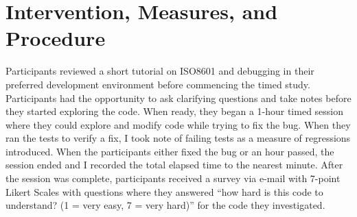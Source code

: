 \section{Intervention, Measures, and Procedure}


Participants reviewed a short tutorial on ISO8601 and debugging in their preferred development environment before commencing the timed study. Participants had the opportunity to ask clarifying questions and take notes before they started exploring the code. When ready, they began a 1-hour timed session where they could explore and modify code while trying to fix the bug. When they ran the tests to verify a fix, I took note of failing tests as a measure of regressions introduced. When the participants either fixed the bug or an hour passed, the session ended and I recorded the total elapsed time to the nearest minute. After the session was complete, participants received a survey via e-mail with 7-point Likert Scales with questions where they answered “how hard is this code to understand? (1 = very easy, 7 = very hard)” for the code they investigated.
